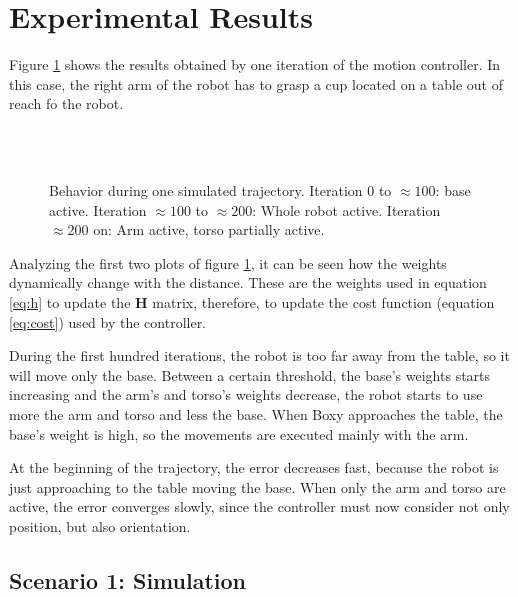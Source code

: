 \section{Experimental Results}

Figure \ref{fig:exp} shows the results obtained by one iteration of the motion controller. In this case, the right arm of the robot has to grasp a cup located on a table out of reach fo the robot.

\begin{figure}[H]
	\centering
	 \\ \vspace{-10pt}
	 \\ \vspace{-5pt}
	 \vspace{-8pt}
	 \vspace{-5pt}
	 \vspace{-20pt}
	\caption[Trajectory Result]{Behavior during one simulated trajectory. Iteration $0$ to $\approx100$: base active. Iteration $\approx100$ to $\approx200$: Whole robot active. Iteration $\approx200$ on: Arm active, torso partially active.} \vspace{-15pt} \label{fig:exp}
\end{figure}

Analyzing  the first two plots of figure \ref{fig:exp}, it can be seen how the weights dynamically change with the distance. These are the weights used in equation \ref{eq:h} to update the $\textbf{H}$ matrix, therefore, to update the cost function (equation \ref{eq:cost}) used by the controller. 

During the first hundred iterations, the robot is too far away from the table, so it will move only the base. Between a certain threshold, the base's weights starts increasing and the arm's and torso's weights decrease, the robot starts to use more the arm and torso and less the base. When Boxy approaches the table, the base's weight is high, so the movements are executed mainly with the arm.

At the beginning of the trajectory, the error decreases fast, because the robot is just approaching to the table moving the base. When only the arm and torso are active, the error converges slowly, since the controller must now consider not only position, but also orientation.

\subsection{Scenario 1: Simulation}
\label{res:sim}

